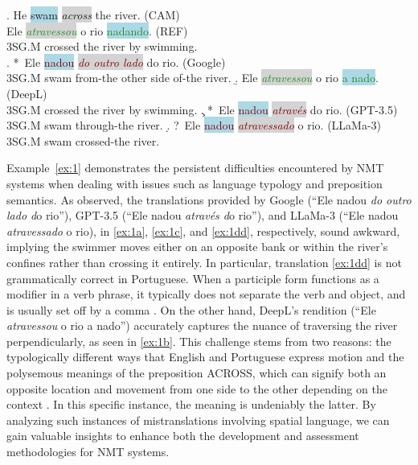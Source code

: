 \ex. He \colorbox{lightblue}{swam} \colorbox{lightgray}{\emph{across}} the river. (CAM) \label{ex:1} \\[0.3ex]
Ele \colorbox{lightgray}{\emph{\textcolor{ForestGreen}{atravessou}}} o rio \colorbox{lightblue}{\textcolor{ForestGreen}{nadando}}. (REF)\label{ex:1d} \\
$3$SG.M crossed the river by swimming. \\[-0.3ex] 
    \a. *~Ele \colorbox{lightblue}{\textcolor{Maroon}{nadou}} \colorbox{lightgray}{\emph{\textcolor{Maroon}{do outro lado}}} do rio. (Google) \label{ex:1a} \\
    $3$SG.M swam from-the other side of-the river.
    \b. Ele \colorbox{lightgray}{\emph{\textcolor{ForestGreen}{atravessou}}} o rio \colorbox{lightblue}{\textcolor{ForestGreen}{a nado}}. (DeepL) \label{ex:1b} \\
    $3$SG.M crossed the river by swimming.
    \c. *~Ele \colorbox{lightblue}{\textcolor{Maroon}{nadou}} \colorbox{lightgray}{\emph{\textcolor{Maroon}{através}}} do rio. (GPT-3.5) \label{ex:1c} \\
    $3$SG.M swam through-the river. 
    \d. ?~Ele \colorbox{lightblue}{\textcolor{Maroon}{nadou}} \colorbox{lightgray}{\emph{\textcolor{Maroon}{atravessado}}} o rio. (LLaMa-3) \\
    $3$SG.M swam crossed-the river. \\[0.3ex] \label{ex:1dd}

Example~\ref{ex:1} demonstrates the persistent difficulties encountered by NMT systems when dealing with issues such as language typology and preposition semantics. As observed, the translations provided by Google (``Ele nadou \emph{do outro lado d}o rio''), GPT-3.5 (``Ele nadou \emph{através d}o rio''), and LLaMa-3 (``Ele nadou \emph{atravessado} o rio), in \ref{ex:1a}, \ref{ex:1c}, and \ref{ex:1dd}, respectively, sound awkward, implying the swimmer moves either on an opposite bank or within the river's confines rather than crossing it entirely. In particular, translation \ref{ex:1dd} is not grammatically correct in Portuguese. When a participle form functions as a modifier in a verb phrase, it typically does not separate the verb and object, and is usually set off by a comma \parencite{cunha2016nova}. On the other hand, DeepL's rendition (``Ele \emph{atravessou} o rio a nado'') accurately captures the nuance of traversing the river perpendicularly, as seen in \ref{ex:1b}. This challenge stems from two reasons: the typologically different ways that English and Portuguese express motion and the polysemous meanings of the preposition ACROSS, which can signify both an opposite location and movement from one side to the other depending on the context \parencite{cambridge-across}. In this specific instance, the meaning is undeniably the latter. By analyzing such instances of mistranslations involving spatial language, we can gain valuable insights to enhance both the development and assessment methodologies for NMT systems.

